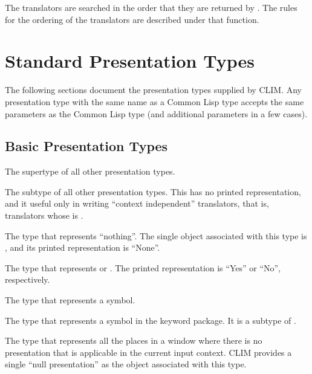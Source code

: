 The translators are searched in the order that they are returned by
.  The rules for the ordering of the
translators are described under that function.


\section {Standard Presentation Types}

The following sections document the presentation types supplied by CLIM.  Any
presentation type with the same name as a Common Lisp type accepts the same
parameters as the Common Lisp type (and additional parameters in a few cases).


\subsection {Basic Presentation Types}

 {}

The supertype of all other presentation types.

 {}

The subtype of all other presentation types.  This has no printed
representation, and it useful only in writing ``context independent''
translators, that is, translators whose  is .

 {}

The type that represents ``nothing''.  The single object associated with this
type is , and its printed representation is ``None''.

 {}

The type that represents  or .  The printed
representation is ``Yes'' or ``No'', respectively.

 {}

The type that represents a symbol.

 {}

The type that represents a symbol in the keyword package.  It is a subtype of
.

 {}

The type that represents all the places in a window where there is no
presentation that is applicable in the current input context.  CLIM provides a
single ``null presentation'' as the object associated with this type.


